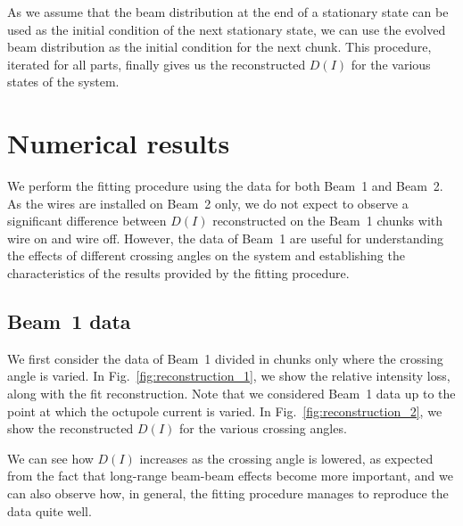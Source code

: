 As we assume that the beam distribution at the end of a stationary state can be used as the initial condition of the next stationary state, we can use the evolved beam distribution as the initial condition for the next chunk. This procedure, iterated for all parts, finally gives us the reconstructed $D(I)$ for the various states of the system.

\section{Numerical results}\label{sec:5:results}

We perform the fitting procedure using the data for both Beam~1 and Beam~2. As the wires are installed on Beam~2 only, we do not expect to observe a significant difference between $D(I)$ reconstructed on the Beam~1 chunks with wire on and wire off. However, the data of Beam~1 are useful for understanding the effects of different crossing angles on the system and establishing the characteristics of the results provided by the fitting procedure.

\subsection*{Beam~1 data}

We first consider the data of Beam~1 divided in chunks only where the crossing angle is varied. In Fig.~\ref{fig:reconstruction_1}, we show the relative intensity loss, along with the fit reconstruction. Note that we considered Beam~1 data up to the point at which the octupole current is varied. In Fig.~\ref{fig:reconstruction_2}, we show the reconstructed $D(I)$ for the various crossing angles.

We can see how $D(I)$ increases as the crossing angle is lowered, as expected from the fact that long-range beam-beam effects become more important, and we can also observe how, in general, the fitting procedure manages to reproduce the data quite well. %

